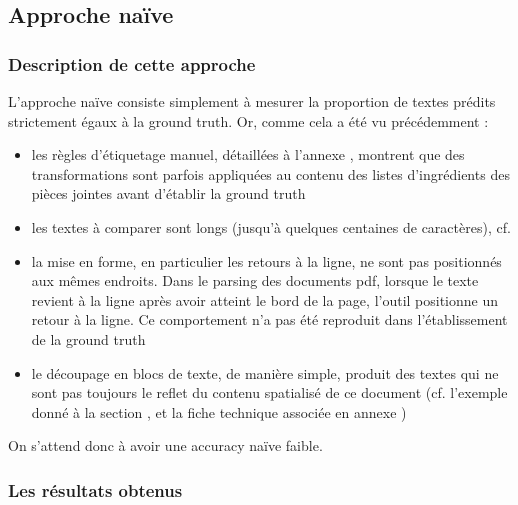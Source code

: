             \subsection{Approche naïve}

                \subsubsection{Description de cette approche}

                L'approche \og naïve \fg consiste simplement à mesurer la proportion de textes prédits strictement égaux à la ground truth.
                Or, comme cela a été vu précédemment : 
                \begin{itemize}
                    \item les règles d'étiquetage manuel, détaillées à l'annexe , montrent que des transformations sont parfois appliquées au contenu des listes d'ingrédients des pièces jointes avant d'établir la ground truth
                    \item les textes à comparer sont longs (jusqu'à quelques centaines de caractères), cf. 
                    \item la mise en forme, en particulier les retours à la ligne, ne sont pas positionnés aux mêmes endroits. Dans le parsing des documents pdf, lorsque le texte revient à la ligne après avoir atteint le bord de la page, l'outil positionne un retour à la ligne. Ce comportement n'a pas été reproduit dans l'établissement de la ground truth
                    \item le découpage en blocs de texte, de manière simple, produit des textes qui ne sont pas toujours le reflet du contenu spatialisé de ce document (cf. l'exemple donné à la section , et la fiche technique associée en annexe )
                \end{itemize}
                On s'attend donc à avoir une \og accuracy naïve \fg faible.

                \subsubsection{Les résultats obtenus}

